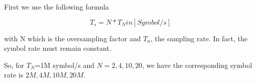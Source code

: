 \documentclass[frenchb, oneside, headings=normal]{scrartcl}
\begin{document}
First we use the following formula

\begin{equation}
T_s=N*T_N in [Symbol/s]
\end{equation}

with N which is the oversampling factor and $T_n$, the sampling rate. In fact, the symbol rate must remain constant.

So, for $T_N$=1M symbol/s and $N= 2, 4, 10, 20$, we have the corresponding symbol rate is $2M, 4M, 10M, 20M$.
\end{document}
